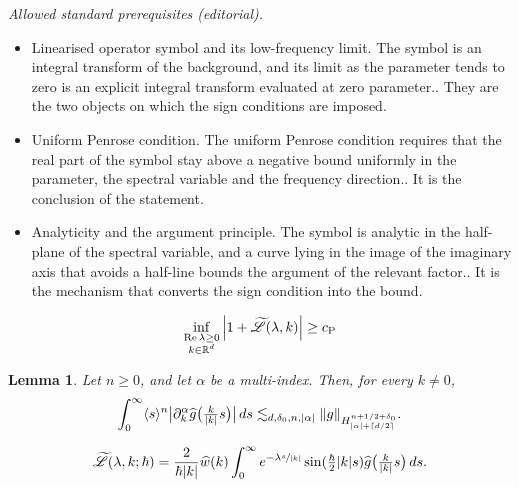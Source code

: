 \documentclass[10pt,a4paper]{article}
\newcommand{\babs}[1]{\bigl|#1\bigr|}
\theoremstyle{plain}
\newtheorem{lemma}[theorem]{Lemma}
\theoremstyle{remark}
\newcommand{\bbr}[1]{\bigl(#1 \bigr)}
\newcommand{\ak}{\abs{k}}
\newcommand{\aal}{\abs{\alpha}}
\newcommand{\p}{\partial}
\newcommand{\jb}[1]{\langle#1\rangle}
\newcommand{\mytextfrac}[2]{{\textstyle\frac{#1}{#2}}}
\newcommand{\R}{\mathbb{R}}
\newcommand{\lam}{\lambda}
\newcommand{\ceils}[1]{\lceil#1\rceil}
\begin{document}
\noindent\textit{Allowed standard prerequisites (editorial).}\begin{itemize}
\item Linearised operator symbol and its low-frequency limit. The symbol is an integral transform of the background, and its limit as the parameter tends to zero is an explicit integral transform evaluated at zero parameter.. They are the two objects on which the sign conditions are imposed.
\item Uniform Penrose condition. The uniform Penrose condition requires that the real part of the symbol stay above a negative bound uniformly in the parameter, the spectral variable and the frequency direction.. It is the conclusion of the statement.
\item Analyticity and the argument principle. The symbol is analytic in the half-plane of the spectral variable, and a curve lying in the image of the imaginary axis that avoids a half-line bounds the argument of the relevant factor.. It is the mechanism that converts the sign condition into the bound.
\end{itemize}\medskip
\begin{align}\label{Penrose}
\inf_{\substack{\Re\lambda \geq 0 \\ k \in \R^d}} \abs{1 + \widetilde{\mathscr{L}}(\lambda, k)} \geq {c_{\mathrm{P}}}
\end{align}

\begin{lemma}\label{gnorm}
Let \( n \geq 0 \), and let \( \alpha \) be a multi-index. Then, for every $k\neq0$,
\begin{align*}
\int_0^\infty\jb{s}^{n}\babs{\p^\alpha_k\widehat g\bbr{\mytextfrac{k}{\abs{k}}s}}\,ds\lesssim_{d,
\delta_0,n,\aal}\norm{g}_{H^{n+{{1/2}}+\delta_0}_{\aal+\ceils{d/2}}}.\end{align*}
\end{lemma}

\begin{align}
\widetilde {\mathscr L}(\lam,k;\hbar)
= \frac{2}{\hbar\ak} \widehat w(k) \int_0^\infty e^{-\lam \sfrac{s}{\ak}} \sin(\mytextfrac{\hbar}{2} \ak s) \widehat g\bbr{\mytextfrac{k}{\ak}s} \, ds. \label{Lingoodcoordinates}
\end{align}
\end{document}
